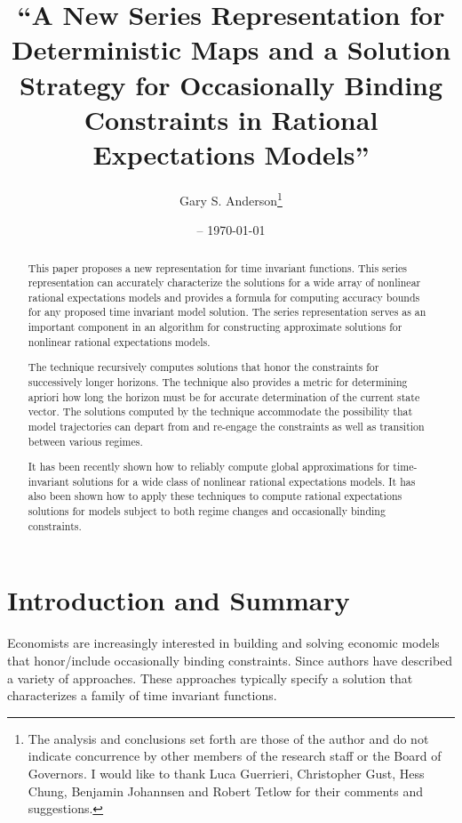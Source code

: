 \documentclass[12pt]{article}
\title{``A New Series Representation for Deterministic Maps and
a Solution Strategy for Occasionally Binding Constraints in Rational Expectations Models''}
\date{\currenttime -- \today }
\author{Gary S. Anderson\thanks{The analysis and conclusions set forth are those of the author and do not indicate concurrence by other members of the research staff or the Board of Governors. I would like to thank Luca Guerrieri, Christopher Gust, Hess Chung, Benjamin Johannsen  and Robert Tetlow for their comments and suggestions. }}
\begin{document}
\maketitle

\begin{abstract}


 
This paper proposes a new representation for time invariant functions.
This series representation 
can accurately characterize the solutions for a 
wide array of nonlinear rational expectations models 
and provides a formula
for computing accuracy bounds for any proposed time invariant model solution.
The series representation serves as an important component in an algorithm 
for constructing approximate solutions for nonlinear rational expectations
models.




  The technique recursively computes  solutions that honor the constraints for successively longer horizons. The technique also provides a metric for determining apriori how long the horizon must be for accurate determination of the current state vector. The solutions computed by the technique accommodate the possibility that model trajectories can depart from and re-engage the constraints as well as transition between various regimes.
  
  
  It has been recently shown how to reliably compute global approximations for time-invariant solutions for a wide class of nonlinear rational expectations models. It has also been shown how to apply these techniques to compute rational expectations solutions for models subject to both regime changes and occasionally binding constraints.



\end{abstract}

 \newpage
 \tableofcontents
 \newpage


\section{Introduction and Summary}

Economists are increasingly interested in building and solving 
economic models that honor/include occasionally binding constraints.
Since \cite{Christiano2000} authors have described a 
variety of approaches.\cite{holden15:_exist_dsge,guerrieri15:_occbin,benigno09,hintermaier10,brumm10,nakov08,haefke98,nakata12,gordon11,billi11,Hintermaier2010,Guerrieri2015}
These approaches typically specify a solution that characterizes a family of
time invariant functions.
\end{document}
